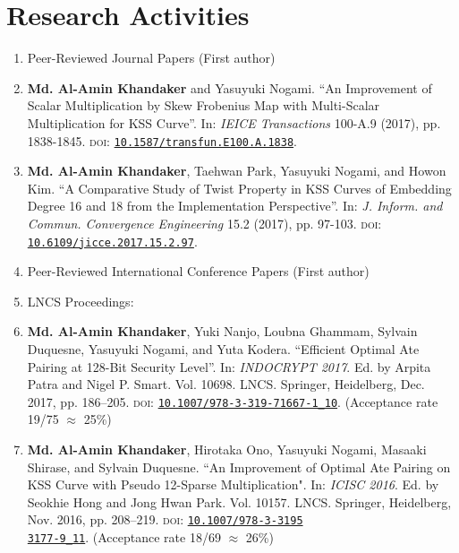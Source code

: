 \newpage
\clearpage
\pagestyle{plain}
\chapter{Research Activities} 
\label{research_activity}
\begin{enumerate}
	\Large
	\item[] Peer-Reviewed Journal Papers  (First author)
	\normalsize
	\item \textbf{Md. Al-Amin Khandaker} and Yasuyuki Nogami. “An Improvement of Scalar Multiplication by Skew Frobenius Map with Multi-Scalar Multiplication for KSS Curve”. In: \textit{IEICE Transactions} 100-A.9 (2017), pp. 1838-1845. \textsc{doi}: \href{https://doi.org/10.1587/transfun.E100.A.1838}{\texttt{10.1587/transfun.E100.A.1838}}.
	\normalsize
	\item\textbf{Md. Al-Amin Khandaker}, Taehwan Park, Yasuyuki Nogami, and Howon Kim. “A Comparative Study of Twist Property in KSS Curves of Embedding Degree 16 and 18 from the Implementation Perspective”. In: \textit{J. Inform. and Commun. Convergence Engineering} 15.2 (2017),  pp. 97-103. \textsc{doi}: \href{https://doi.org/10.6109/jicce.2017.15.2.97}{\texttt{10.6109/jicce.2017.15.2.97}}.
	\vspace{10mm}
	\item[ ] \Large Peer-Reviewed International Conference Papers  (First author)
	\normalsize
	\item[ ] \Large LNCS Proceedings:
	\normalsize
	\item \textbf{Md. Al-Amin Khandaker}, Yuki Nanjo, Loubna Ghammam, Sylvain Duquesne, Yasuyuki Nogami, and Yuta Kodera. “Efficient Optimal Ate Pairing at 128-Bit Security Level”. In: \textit{INDOCRYPT 2017}. Ed. by Arpita Patra
	and Nigel P. Smart. Vol. 10698. LNCS. Springer, Heidelberg, Dec. 2017, pp. 186–205. \textsc{doi}: \href{https://doi.org/10.1007/978-3-319-71667-1_10}{\texttt{10.1007/978-3-319-71667-1\_10}}. 	(Acceptance rate 19/75 $\approx$ 25\%)
	
	\item \textbf{Md. Al-Amin Khandaker}, Hirotaka Ono, Yasuyuki Nogami, Masaaki Shirase, and Sylvain Duquesne. ``An Improvement of Optimal Ate Pairing
	on KSS Curve with Pseudo 12-Sparse Multiplication". In: \textit{ICISC 2016}. Ed. by Seokhie Hong and Jong Hwan Park. Vol. 10157. LNCS. Springer, Heidelberg, Nov. 2016, pp. 208–219. \textsc{doi}: \href{https://doi.org/10.1007/978-3-319-53177-9_11}{\texttt{10.1007/978-3-3195\\3177-9\_11}}. 
	(Acceptance rate 18/69 $\approx$ 26\%)
	

\end{enumerate}
